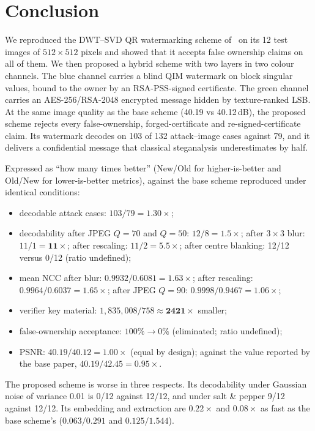 \documentclass[11pt,a4paper]{article}
\begin{document}
\section{Conclusion}\label{sec:conclusion}

We reproduced the DWT--SVD QR watermarking scheme of~\cite{sanivarapu2022} on its 12 test images of $512\times512$ pixels and showed that it accepts false ownership claims on all of them. We then proposed a hybrid scheme with two layers in two colour channels. The blue channel carries a blind QIM watermark on block singular values, bound to the owner by an RSA-PSS-signed certificate. The green channel carries an AES-256/RSA-2048 encrypted message hidden by texture-ranked LSB. At the same image quality as the base scheme (40.19 vs 40.12\,dB), the proposed scheme rejects every false-ownership, forged-certificate and re-signed-certificate claim. Its watermark decodes on 103 of 132 attack--image cases against 79, and it delivers a confidential message that classical steganalysis underestimates by half.

Expressed as ``how many times better'' (New/Old for higher-is-better and Old/New for lower-is-better metrics), against the base scheme reproduced under identical conditions:
\begin{itemize}
  \item decodable attack cases: $103/79 = \mathbf{1.30\times}$;
  \item decodability after JPEG $Q=70$ and $Q=50$: $12/8=\mathbf{1.5\times}$; after $3\times3$ blur: $11/1=\mathbf{11\times}$; after rescaling: $11/2=\mathbf{5.5\times}$; after centre blanking: 12/12 versus 0/12 (ratio undefined);
  \item mean NCC after blur: $0.9932/0.6081=\mathbf{1.63\times}$; after rescaling: $0.9964/0.6037=\mathbf{1.65\times}$; after JPEG $Q=90$: $0.9998/0.9467=1.06\times$;
  \item verifier key material: $1{,}835{,}008/758\approx\mathbf{2421\times}$ smaller;
  \item false-ownership acceptance: $100\%\rightarrow0\%$ (eliminated; ratio undefined);
  \item PSNR: $40.19/40.12=1.00\times$ (equal by design); against the value reported by the base paper, $40.19/42.45=0.95\times$.
\end{itemize}
The proposed scheme is worse in three respects. Its decodability under Gaussian noise of variance 0.01 is 0/12 against 12/12, and under salt \& pepper 9/12 against 12/12. Its embedding and extraction are $0.22\times$ and $0.08\times$ as fast as the base scheme's ($0.063/0.291$ and $0.125/1.544$).
\end{document}
